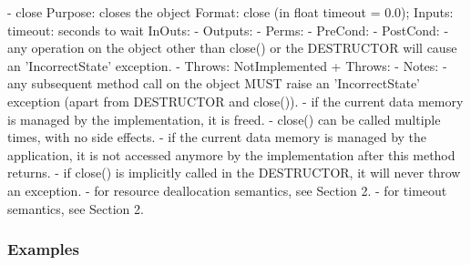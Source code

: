 \begin{myspec}
 
    - close
      Purpose:  closes the object
      Format:   close              (in  float timeout = 0.0);
      Inputs:   timeout:            seconds to wait
      InOuts:   -
      Outputs:  -
      Perms:    -
      PreCond:  -
      PostCond: - any operation on the object other than 
                  close() or the DESTRUCTOR will cause 
                  an 'IncorrectState' exception.
-     Throws:   NotImplemented
+     Throws:   -
      Notes:    - any subsequent method call on the object
                  MUST raise an 'IncorrectState' exception
                  (apart from DESTRUCTOR and close()).
                - if the current data memory is managed by the
                  implementation, it is freed.
                - close() can be called multiple times, with no
                  side effects.
                - if the current data memory is managed by the
                  application, it is not accessed anymore by the
                  implementation after this method returns.
                - if close() is implicitly called in the
                  DESTRUCTOR, it will never throw an exception.
                - for resource deallocation semantics, see 
                  Section 2.
                - for timeout semantics, see Section 2.
 \end{myspec}
 
 
 \subsubsection{Examples}
 

